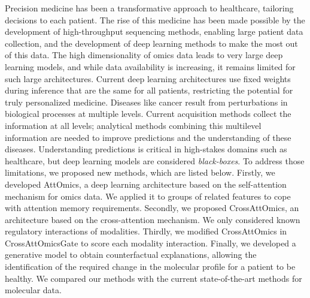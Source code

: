 Precision medicine has been a transformative approach to healthcare, tailoring decisions to each patient.
The rise of this medicine has been made possible by the development of high-throughput sequencing methods, enabling large patient data collection, and the development of deep learning methods to make the most out of this data.
The high dimensionality of omics data leads to very large deep learning models, and while data availability is increasing, it remains limited for such large architectures.
Current deep learning architectures use fixed weights during inference that are the same for all patients, restricting the potential for truly personalized medicine.
Diseases like cancer result from perturbations in biological processes at multiple levels.
Current acquisition methods collect the information at all levels; analytical methods combining this multilevel information are needed to improve predictions and the understanding of these diseases.
Understanding predictions is critical in high-stakes domains such as healthcare, but deep learning models are considered \textit{black-boxes}.
To address those limitations, we proposed new methods, which are listed below.
Firstly, we developed AttOmics, a deep learning architecture based on the self-attention mechanism for omics data.
We applied it to groups of related features to cope with attention memory requirements.
Secondly, we proposed CrossAttOmics, an architecture based on the cross-attention mechanism.
We only considered known regulatory interactions of modalities.
Thirdly, we modified CrossAttOmics in CrossAttOmicsGate to score each modality interaction.
Finally, we developed a generative model to obtain counterfactual explanations, allowing the identification of the required change in the molecular profile for a patient to be healthy.
We compared our methods with the current state-of-the-art methods for molecular data.